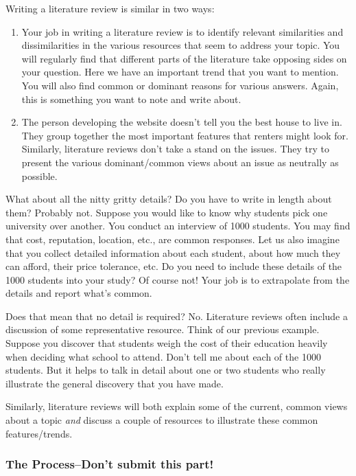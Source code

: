 \documentclass[oneside]{article}
\begin{document}
Writing a literature review is similar in two ways:

\begin{enumerate}
\def\labelenumi{\arabic{enumi}.}
\itemsep1pt\parskip0pt
\item
  Your job in writing a literature review is to identify relevant
  similarities and dissimilarities in the various resources that seem to
  address your topic. You will regularly find that different parts of
  the literature take opposing sides on your question. Here we have an
  important trend that you want to mention. You will also find common or
  dominant reasons for various answers. Again, this is something you
  want to note and write about.
\item
  The person developing the website doesn't tell you the best house to
  live in. They group together the most important features that renters
  might look for. Similarly, literature reviews don't take a stand on
  the issues. They try to present the various dominant/common views
  about an issue as neutrally as possible.
\end{enumerate}

What about all the nitty gritty details? Do you have to write in length
about them? Probably not. Suppose you would like to know why students
pick one university over another. You conduct an interview of 1000
students. You may find that cost, reputation, location, etc., are common
responses. Let us also imagine that you collect detailed information
about each student, about how much they can afford, their price
tolerance, etc. Do you need to include these details of the 1000
students into your study? Of course not! Your job is to extrapolate from
the details and report what's common.

Does that mean that no detail is required? No. Literature reviews often
include a discussion of some representative resource. Think of our
previous example. Suppose you discover that students weigh the cost of
their education heavily when deciding what school to attend. Don't tell
me about each of the 1000 students. But it helps to talk in detail about
one or two students who really illustrate the general discovery that you
have made.

Similarly, literature reviews will both explain some of the current,
common views about a topic \emph{and} discuss a couple of resources to
illustrate these common features/trends.

\subsubsection{The Process--Don't submit this
part!}\label{the-processdont-submit-this-part}
\end{document}
